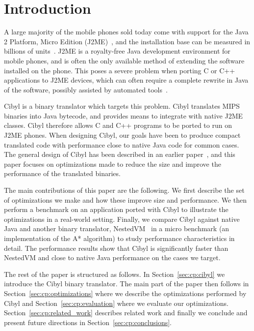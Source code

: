 \section{Introduction}
A large majority of the mobile phones sold today come with support for the
Java 2 Platform, Micro Edition (J2ME)~\cite{j2me}, and the installation base
can be measured in billions of units~\cite{schwartz06j2mecoverage}. J2ME is a
royalty-free Java development environment for mobile phones, and is often the
only available method of extending the software installed on the phone. This
poses a severe problem when porting C or C++ applications to J2ME devices,
which can often require a complete rewrite in Java of the software, possibly
assisted by automated tools~\cite{martin02ephedra, buddrus98cappucino,
  malabarba99mohca, jazillan}.

Cibyl is a binary translator which targets this problem. Cibyl translates MIPS
binaries into Java bytecode, and provides means to integrate with native J2ME
classes. Cibyl therefore allows C and C++ programs to be ported to run on J2ME
phones. When designing Cibyl, our goals have been to produce compact
translated code with performance close to native Java code for common cases.
The general design of Cibyl has been described in an earlier
paper~\cite{kagstrom07cibyl}, and this paper focuses on optimizations made
to reduce the size and improve the performance of the translated binaries.

The main contributions of this paper are the following. We first describe the
set of optimizations we make and how these improve size and performance. We
then perform a benchmark on an application ported with Cibyl to illustrate the
optimizations in a real-world setting. Finally, we compare Cibyl against
native Java and another binary translator, NestedVM~\cite{alliet04nestedvm} in
a micro benchmark (an implementation of the A* algorithm) to study performance
characteristics in detail. The performance results show that Cibyl is
significantly faster than NestedVM and close to native Java performance on the
cases we target.

The rest of the paper is structured as follows. In Section~\ref{sec:cp:cibyl}
we introduce the Cibyl binary translator. The main part of the paper then
follows in Section~\ref{sec:cp:optimizations} where we describe the
optimizations performed by Cibyl and Section~\ref{sec:cp:evaluation} where we
evaluate our optimizations. Section~\ref{sec:cp:related_work} describes
related work and finally we conclude and present future directions in
Section~\ref{sec:cp:conclusions}.

